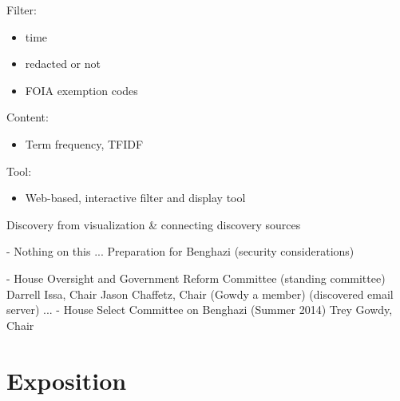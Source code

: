 \documentclass[journal]{vgtc}                %
\begin{document}
  
 Filter:
\begin{itemize}
\item time
\item redacted or not
\item FOIA exemption codes
\end{itemize}

   
 Content:
\begin{itemize}
\item Term frequency, TFIDF
\end{itemize}

   
 Tool: 
\begin{itemize}
\item Web-based, interactive filter and display tool
\end{itemize}
    
    
Discovery from visualization \& connecting discovery sources



- Nothing on this ... Preparation for Benghazi (security considerations)

- House Oversight and Government Reform Committee (standing committee) 
  Darrell Issa, Chair
     Jason Chaffetz, Chair (Gowdy a member)
  (discovered email server)
    ... 
- House Select Committee on Benghazi (Summer 2014) 
   Trey Gowdy, Chair

\section{Exposition}



\newpage

%
%
%
%


\end{document}
